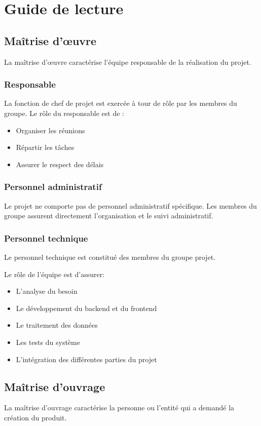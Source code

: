 \documentclass[a4paper,12pt]{report}
\begin{document}
\chapter{Guide de lecture}

\section{Maîtrise d’œuvre}
La maîtrise d'œuvre caractérise l'équipe responsable de la réalisation du projet.
\subsection{Responsable}
La fonction de chef de projet est exercée à tour de rôle par les membres du groupe.
Le rôle du responsable est de :
\begin{itemize}
    \item Organiser les réunions
    \item Répartir les tâches
    \item Assurer le respect des délais
\end{itemize}
\subsection{Personnel administratif}
Le projet ne comporte pas de personnel administratif spécifique. Les membres du groupe assurent directement l’organisation et le suivi administratif.  
\subsection{Personnel technique}
Le personnel technique est constitué des membres du groupe projet.

Le rôle de l’équipe est d’assurer:

\begin{itemize}
\label{BE1}
    \item L’analyse du besoin
    \item Le développement du backend et du frontend
    \item Le traitement des données
    \item Les tests du système
    \item L’intégration des différentes parties du projet
\end{itemize}
\newpage
\section{Maîtrise d’ouvrage}
La maîtrise d'ouvrage caractérise la personne ou l'entité qui a demandé la création du produit.
\end{document}

